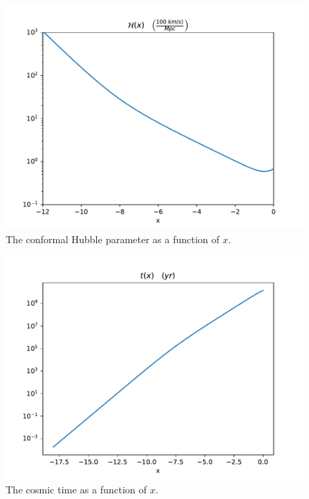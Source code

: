 \documentclass{aa}
\begin{document}



\begin{figure}[H]
   \includegraphics[scale=0.6]{../figures/milestone1/Hp_x.pdf}
   \caption{The conformal Hubble parameter as a function of $x$.}\label{fig:M1_Hp}
\end{figure}

\begin{figure}[H]
   \includegraphics[scale=0.6]{../figures/milestone1/t_x.pdf}
   \caption{The cosmic time as a function of $x$.}\label{fig:M1_t_x}
\end{figure}
\end{document}
